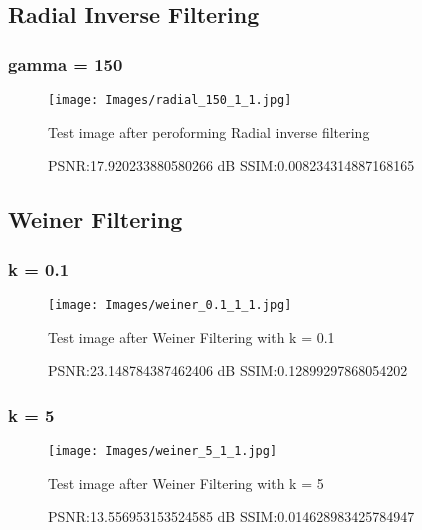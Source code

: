 \documentclass{article}
\begin{document}
\subsection{Radial Inverse Filtering}
\subsubsection{gamma = 150}
\begin{figure}[!Hp]

\begin{minipage}[!b]{1.0\linewidth}
  \centering
  \centerline{\texttt{[image: Images/radial\_150\_1\_1.jpg]}}
  \centerline{Test image after peroforming Radial inverse filtering}\medskip
  PSNR:17.920233880580266 dB
  SSIM:0.008234314887168165
\end{minipage}
%
\end{figure}



\subsection[!Hp]{Weiner Filtering}
\subsubsection[!Hp]{k = 0.1}
\begin{figure}[!Hp]

\begin{minipage}[!b]{1.0\linewidth}
  \centering
  \centerline{\texttt{[image: Images/weiner\_0.1\_1\_1.jpg]}}
  \centerline{Test image after Weiner Filtering with k = 0.1}\medskip
   PSNR:23.148784387462406 dB
  SSIM:0.12899297868054202
\end{minipage}
%
\end{figure}
\subsubsection[!Hp]{k = 5}
\begin{figure}[!Hp]

\begin{minipage}[!b]{1.0\linewidth}
  \centering
  \centerline{\texttt{[image: Images/weiner\_5\_1\_1.jpg]}}
  \centerline{Test image after Weiner Filtering with k = 5}\medskip
   PSNR:13.556953153524585 dB
  SSIM:0.014628983425784947
\end{minipage}
%
\end{figure}
\end{document}

